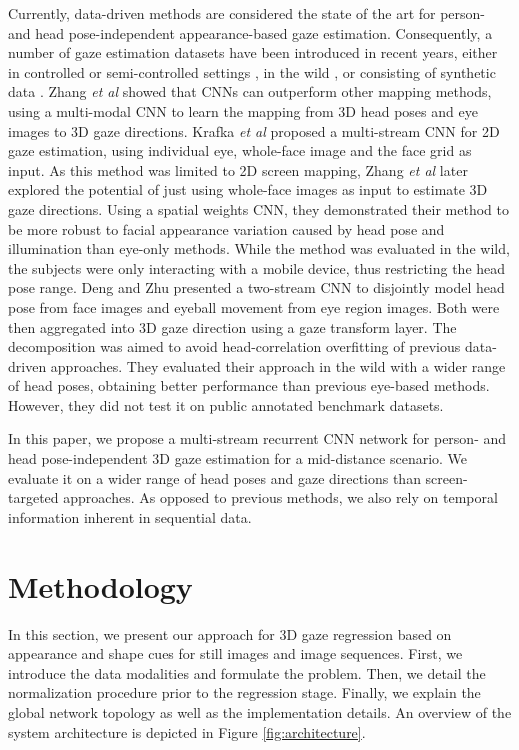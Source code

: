 \documentclass{bmvc2k}
\def\etal{\emph{et al}\bmvaOneDot}
\begin{document}
Currently, data-driven methods are considered the state of the art for person- and  head pose-independent appearance-based gaze estimation. Consequently, a number of gaze estimation datasets have been introduced in recent years, either in controlled \cite{smith2013gaze} or semi-controlled settings \cite{funes2014eyediap}, in the wild \cite{zhang2015appearance, krafka2016eye}, or consisting of synthetic data \cite{sugano2014learning, wood2015rendering, wood2016learning}. Zhang \etal \cite{zhang2015appearance} showed that CNNs can outperform other mapping methods, using a multi-modal CNN to learn the mapping from 3D head poses and eye images to 3D gaze directions. Krafka \etal \cite{krafka2016eye} proposed a multi-stream CNN for 2D gaze estimation, using individual eye, whole-face image and the face grid as input. As this method was limited to 2D screen mapping, Zhang \etal \cite{zhang2017s} later explored the potential of just using whole-face images as input to estimate 3D gaze directions. Using a spatial weights CNN, they demonstrated their method to be more robust to facial appearance variation caused by head pose and illumination than eye-only methods. While the method was evaluated in the wild, the subjects were only interacting with a mobile device, thus restricting the head pose range. Deng and Zhu \cite{deng2017monocular} presented a two-stream CNN to disjointly model head pose from face images and eyeball movement from eye region images. Both were then aggregated into 3D gaze direction using a gaze transform layer. The decomposition was aimed to avoid head-correlation overfitting of previous data-driven approaches. They evaluated their approach in the wild with a wider range of head poses, obtaining better performance than previous eye-based methods. However, they did not test it on public annotated benchmark datasets.

In this paper, we propose a multi-stream recurrent CNN network for person- and head pose-independent 3D gaze estimation for a mid-distance scenario. We evaluate it on a wider range of head poses and gaze directions than screen-targeted approaches. As opposed to previous methods, we also rely on temporal information inherent in sequential data. 

\section{Methodology}
\label{sec:method}


In this section, we present our approach for 3D gaze regression based on appearance and shape cues for still images and image sequences. First, we introduce the data modalities and formulate the problem. Then, we detail the normalization procedure prior to the regression stage. Finally, we explain the global network topology as well as the implementation details. An overview of the system architecture is depicted in Figure \ref{fig:architecture}.
\end{document}
